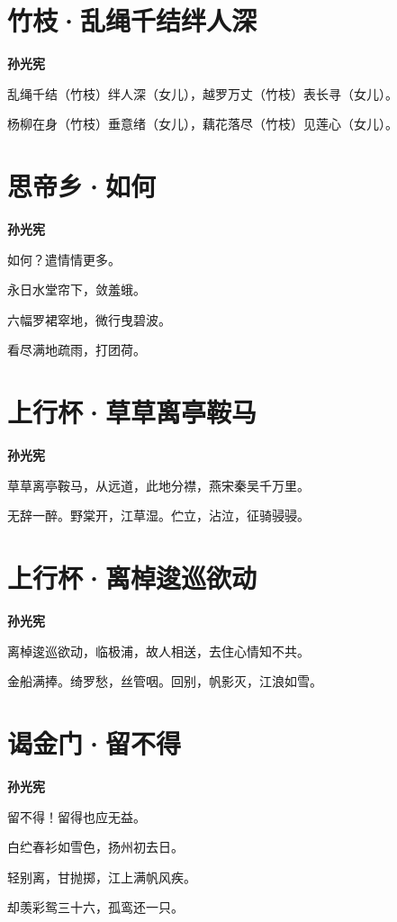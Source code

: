 \documentclass[12pt,a4paper]{ctexbook}
\begin{document}
\section{竹枝·乱绳千结绊人深}
\textbf{孙光宪}\par\vspace{0.5em}
乱绳千结（竹枝）绊人深（女儿），越罗万丈（竹枝）表长寻（女儿）。\par
杨柳在身（竹枝）垂意绪（女儿），藕花落尽（竹枝）见莲心（女儿）。\par

\section{思帝乡·如何}
\textbf{孙光宪}\par\vspace{0.5em}
如何？遣情情更多。\par
永日水堂帘下，敛羞蛾。\par
六幅罗裙窣地，微行曳碧波。\par
看尽满地疏雨，打团荷。\par

\section{上行杯·草草离亭鞍马}
\textbf{孙光宪}\par\vspace{0.5em}
草草离亭鞍马，从远道，此地分襟，燕宋秦吴千万里。\par
无辞一醉。野棠开，江草湿。伫立，沾泣，征骑骎骎。\par

\section{上行杯·离棹逡巡欲动}
\textbf{孙光宪}\par\vspace{0.5em}
离棹逡巡欲动，临极浦，故人相送，去住心情知不共。\par
金船满捧。绮罗愁，丝管咽。回别，帆影灭，江浪如雪。\par

\section{谒金门·留不得}
\textbf{孙光宪}\par\vspace{0.5em}
留不得！留得也应无益。\par
白纻春衫如雪色，扬州初去日。\par
轻别离，甘抛掷，江上满帆风疾。\par
却羡彩鸳三十六，孤鸾还一只。\par
\end{document}
